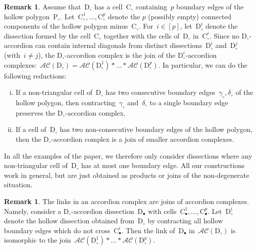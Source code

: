 \documentclass{amsart}
\theoremstyle{definition}
\newtheorem{remark}[theorem]{Remark}
\newcommand{\accordionComplex}{\mathcal{AC}} %
\newcommand{\polygon}{\mathrm{P}} %
\newcommand{\dissection}{\mathrm{D}} %
\newcommand{\cell}{\mathrm{C}} %
\begin{document}
\begin{remark}
\label{rem:reduction}
Assume that~$\dissection_\circ$ has a cell~$\cell_\circ$ containing~$p$ boundary edges of the hollow polygon~$\polygon_\circ$. Let~$\cell_\circ^1, \dots, \cell_\circ^p$ denote the $p$ (possibly empty) connected components of the hollow polygon minus~$\cell_\circ$. For~$i \in [p]$, let~$\dissection_\circ^i$ denote the dissection formed by the cell~$\cell_\circ$ together with the cells of~$\dissection_\circ$ in~$\cell_\circ^i$. Since no $\dissection_\circ$-accordion can contain internal diagonals from distinct dissections~$\dissection_\circ^i$ and~$\dissection_\circ^j$ (with~$i \ne j$), the $\dissection_\circ$-accordion complex is the join of the $\dissection_\circ^i$-accordion complexes:~${\accordionComplex(\dissection_\circ) = \accordionComplex(\dissection_\circ^1) * \dots * \accordionComplex(\dissection_\circ^p)}$. In particular, we can do the following reductions:
\begin{enumerate}[(i)]
\item If a non-triangular cell of~$\dissection_\circ$ has two consecutive boundary edges~$\gamma_\circ, \delta_\circ$ of the hollow polygon, then contracting~$\gamma_\circ$ and~$\delta_\circ$ to a single boundary edge preserves the $\dissection_\circ$-accordion complex.
\item If a cell of~$\dissection_\circ$ has two non-consecutive boundary edges of the hollow polygon, then the $\dissection_\circ$-accordion complex is a join of smaller accordion complexes.
\end{enumerate}
In all the examples of the paper, we therefore only consider dissections where any non-triangular cell of~$\dissection_\circ$ has at most one boundary edge. All our constructions work in general, but are just obtained as products or joins of the non-degenerate situation.
\end{remark}

\begin{remark}
\label{rem:links}
The links in an accordion complex are joins of accordion complexes. Namely, consider a $\dissection_\circ$-accordion dissection~$\dissection_\bullet$ with cells~$\cell_\bullet^1, \dots, \cell_\bullet^p$. Let~$\dissection_\circ^i$ denote the hollow dissection obtained from~$\dissection_\circ$ by contracting all hollow boundary edges which do not cross~$\cell_\bullet^i$. Then the link of~$\dissection_\bullet$ in~$\accordionComplex(\dissection_\circ)$ is isomorphic to the join~$\accordionComplex(\dissection_\circ^1) * \dots * \accordionComplex(\dissection_\circ^p)$.
\end{remark}
\end{document}
